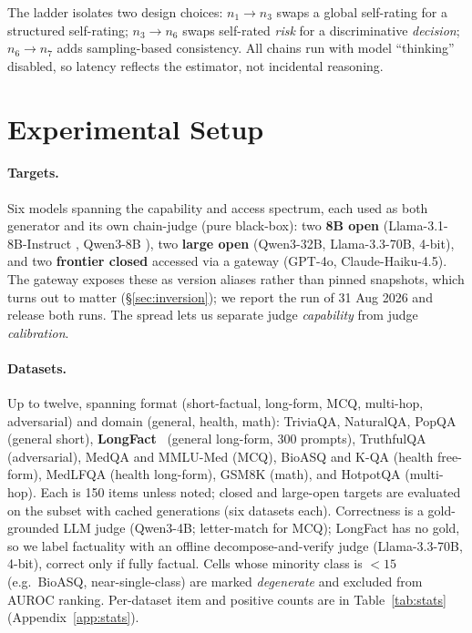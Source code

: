 \documentclass[11pt]{article}
\begin{document}
The ladder isolates two design choices: $n_1{\to}n_3$ swaps a global self-rating for a
structured self-rating; $n_3{\to}n_6$ swaps self-rated \emph{risk} for a discriminative
\emph{decision}; $n_6{\to}n_7$ adds sampling-based consistency. All chains run with model
``thinking'' disabled, so latency reflects the estimator, not incidental reasoning.

\section{Experimental Setup}\label{sec:setup}
\paragraph{Targets.} Six models spanning the capability and access spectrum, each used as
both generator and its own chain-judge (pure black-box): two \textbf{8B open}
(Llama-3.1-8B-Instruct \citep{dubey2024llama3}, Qwen3-8B \citep{yang2024qwen3}), two
\textbf{large open} (Qwen3-32B, Llama-3.3-70B,
4-bit), and two \textbf{frontier closed} accessed via a gateway (GPT-4o, Claude-Haiku-4.5). The gateway
exposes these as version aliases rather than pinned snapshots, which turns out to matter
(\S\ref{sec:inversion}); we report the run of 31 Aug 2026 and release both runs.
The spread lets us separate judge \emph{capability} from judge \emph{calibration}.

\paragraph{Datasets.} Up to twelve, spanning format (short-factual, long-form, MCQ,
multi-hop, adversarial) and domain (general, health, math): TriviaQA, NaturalQA, PopQA
(general short), \textbf{LongFact}~\citep{wei2024longfact} (general long-form, 300 prompts),
TruthfulQA \citep{lin2021truthfulqa} (adversarial), MedQA \citep{jin2021medqa} and MMLU-Med
(MCQ), BioASQ \citep{tsatsaronis2015bioasq} and K-QA (health free-form), MedLFQA (health
long-form), GSM8K \citep{cobbe2021gsm8k} (math), and HotpotQA (multi-hop). Each is 150 items unless noted; closed and
large-open targets are evaluated on the subset with cached generations (six datasets each).
Correctness is a gold-grounded LLM judge (Qwen3-4B; letter-match for MCQ); LongFact has no
gold, so we label factuality with an offline decompose-and-verify judge (Llama-3.3-70B,
4-bit), correct only if fully factual. Cells whose minority class is $<15$ (e.g.\ BioASQ,
near-single-class) are marked \emph{degenerate} and excluded from AUROC ranking. Per-dataset
item and positive counts are in Table~\ref{tab:stats} (Appendix~\ref{app:stats}).
\end{document}
